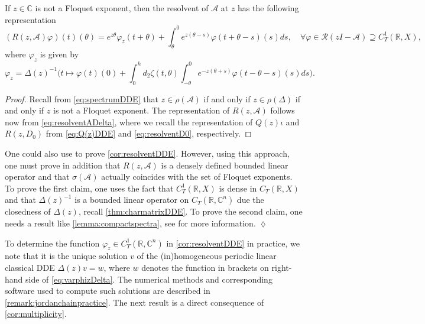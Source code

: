 \documentclass[english]{myarticle}
\begin{document}
\begin{sloppypar}
\begin{corollary} \label{cor:resolventDDE}
If $z \in \mathbb{C}$ is not a Floquet exponent, then the resolvent of $\mathcal{A}$ at $z$ has the following representation
\begin{equation*}
    (R(z,\mathcal{A}) \varphi)(t)(\theta) = e^{z \theta} \varphi_z(t+\theta) + \int_\theta^0 e^{z(\theta-s)} \varphi(t+\theta-s)(s) ds, \quad \forall \varphi \in \mathcal{R}(zI-\mathcal{A}) \supseteq C_T^1(\mathbb{R},X),
\end{equation*}
where $\varphi_z$ is given by
\begin{equation} \label{eq:varphizDelta}
    \varphi_z = \Delta(z)^{-1} \bigg( t \mapsto \varphi(t)(0) + \int_0^h d_2 \zeta(t,\theta)\int_{-\theta}^{0} e^{-z(\theta + s)} \varphi(t -\theta - s)(s) ds \bigg).
\end{equation}
\end{corollary}
\begin{proof}
Recall from \eqref{eq:spectrumDDE} that $z \in \rho(\mathcal{A})$ if and only if $z \in \rho(\Delta)$ if and only if $z$ is not a Floquet exponent. The representation of $R(z,\mathcal{A})$ follows now from \eqref{eq:resolventADelta}, where we recall the representation of $Q(z)\iota$ and $R(z,D_0)$ from \eqref{eq:Q(z)DDE} and \eqref{eq:resolventD0}, respectively.
\end{proof}

\begin{remark}
One could also use \cite[Proposition 12]{Bosschaert2025} to prove \cref{cor:resolventDDE}. However, using this approach, one must prove in addition that $R(z,\mathcal{A})$ is a densely defined bounded linear operator and that $\sigma(\mathcal{A})$ actually coincides with the set of Floquet exponents. To prove the first claim, one uses the fact that $C_T^1(\mathbb{R},X)$ is dense in $C_T(\mathbb{R},X)$ and that $\Delta(z)^{-1}$ is a bounded linear operator on $C_T(\mathbb{R},\mathbb{C}^n)$ due the closedness of $\Delta(z)$, recall \cref{thm:charmatrixDDE}. To prove the second claim, one needs a result like \cref{lemma:compactspectra}, see \cite{Article2} for more information. \hfill $\lozenge$
\end{remark}

To determine the function $\varphi_z \in C_T^1(\mathbb{R},\mathbb{C}^n)$ in \cref{cor:resolventDDE} in practice, we note that it is the unique solution $v$ of the (in)homogeneous periodic linear classical DDE $\Delta(z)v = w$, where $w$ denotes the function in brackets on right-hand side of \eqref{eq:varphizDelta}. The numerical methods and corresponding software used to compute such solutions are described in \cref{remark:jordanchainpractice}. The next result is a direct consequence of \cref{cor:multiplicity}.


\end{sloppypar}
\end{document}
